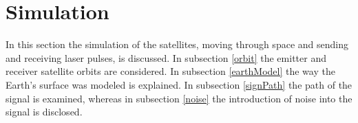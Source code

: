 \section{Simulation}
\label{sim}
In this section the simulation of the satellites, moving through space and sending and receiving laser pulses, is discussed. In subsection \ref{orbit} the emitter and receiver satellite orbits are considered. In subsection \ref{earthModel} the way the Earth's surface was modeled is explained. In subsection \ref{signPath} the path of the signal is examined, whereas in subsection \ref{noise} the introduction of noise into the signal is disclosed.